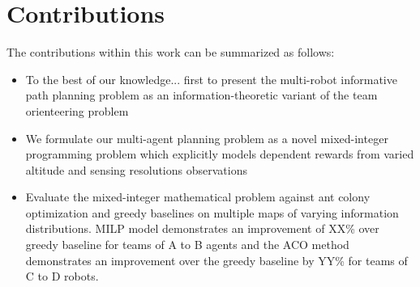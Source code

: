 \documentclass[11pt,a4paper,twoside]{article}
\begin{document}
\bigskip\noindent

\section*{Contributions}

The contributions within this work can be summarized as follows:
\begin{itemize}
    \item To the best of our knowledge... first to present the multi-robot informative path planning problem as an information-theoretic variant of the team orienteering problem
    \item We formulate our multi-agent planning problem as a novel mixed-integer programming problem which explicitly models dependent rewards from varied altitude and sensing resolutions observations
    \item Evaluate the mixed-integer mathematical problem against ant colony optimization and greedy baselines on multiple maps of varying information distributions. MILP model demonstrates an improvement of XX\% over greedy baseline for teams of A to B agents and the ACO method demonstrates an improvement over the greedy baseline by YY\% for teams of C to D robots. 
\end{itemize}

\end{document}

